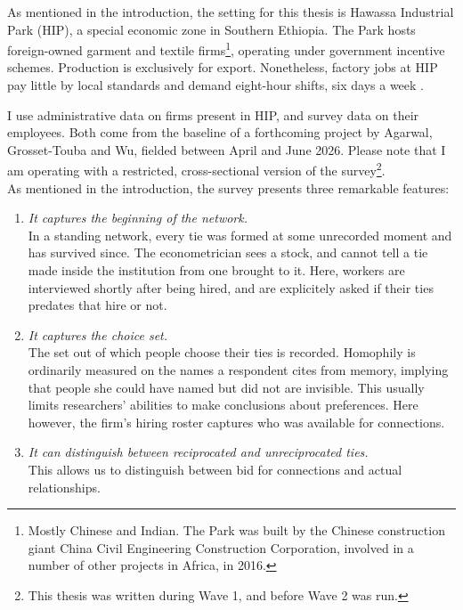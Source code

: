 \label{sec:setting-survey}

\noindent As mentioned in the introduction, the setting for this thesis is Hawassa Industrial Park (HIP), a special economic zone in Southern Ethiopia. The Park hosts foreign-owned garment and textile firms\footnote{Mostly Chinese and Indian. The Park was built by the Chinese construction giant China Civil Engineering Construction Corporation, involved in a number of other projects in Africa, in 2016.}, operating under government incentive schemes. Production is exclusively for export. Nonetheless, factory jobs at HIP pay little by local standards and demand eight-hour shifts, six days a week \citep{agarwal2026fieldnotes}. \\
\smallskip


\noindent I use administrative data on firms present in HIP, and survey data on their employees. Both come from the baseline of a forthcoming project by Agarwal, Grosset-Touba and Wu, fielded between April and June 2026. Please note that I am operating with a restricted, cross-sectional version of the survey\footnote{This thesis was written during Wave 1, and before Wave 2 was run.}.\\

\noindent As mentioned in the introduction, the survey presents three remarkable features:
\begin{enumerate}
    \item \textit{It captures the beginning of the network.} \\
    In a standing network, every tie was formed at some unrecorded moment and has survived since. The econometrician sees a stock, and cannot tell a tie made inside the institution from one brought to it. Here, workers are interviewed shortly after being hired, and are explicitely asked if their ties predates that hire or not. 
    \item  \textit{It captures the choice set.} \\
    The set out of which people choose their ties is recorded. Homophily is ordinarily measured on the names a respondent cites from memory, implying that people she could have named but did not are invisible. This usually limits researchers' abilities to make conclusions about preferences. Here however, the firm's hiring roster captures who was available for connections.
    \item \textit{It can distinguish between reciprocated and unreciprocated ties.} \\
    This allows us to distinguish between bid for connections and actual relationships.
\end{enumerate}


